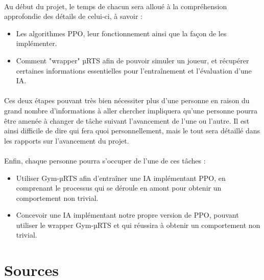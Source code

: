\documentclass[french]{article}
\begin{document}
	\paragraph*{}
	Au début du projet, le temps de chacun sera alloué à la compréhension approfondie des détails de celui-ci, à savoir :
	
	\begin{itemize}
		\vspace{2mm}
		\item Les algorithmes PPO, leur fonctionnement ainsi que la façon de les implémenter.
		\vspace{2mm}
		\item Comment "wrapper" µRTS afin de pouvoir simuler un joueur, et récupérer certaines informations essentielles pour l'entraînement et l'évaluation d'une IA.
	\end{itemize}
	
	\paragraph*{}
	Ces deux étapes pouvant très bien nécessiter plus d'une personne en raison du grand nombre d'informations à aller chercher impliquera qu'une personne pourra être amenée à changer de tâche suivant l'avancement de l'une ou l'autre. Il est ainsi difficile de dire qui fera quoi personnellement, mais le tout sera détaillé dans les rapports sur l'avancement du projet.
	
	\paragraph*{}
	Enfin, chaque personne pourra s'occuper de l'une de ces tâches :
	
	\begin{itemize}
		\vspace{2mm}
		\item Utiliser Gym-µRTS afin d'entraîner une IA implémentant PPO, en comprenant le processus qui se déroule en amont pour obtenir un comportement non trivial.
		\vspace{2mm}
		\item Concevoir une IA implémentant notre propre version de PPO, pouvant utiliser le wrapper Gym-µRTS et qui réussira à obtenir un comportement non trivial.
	\end{itemize}
	
	\section{Sources}
	
\end{document}
